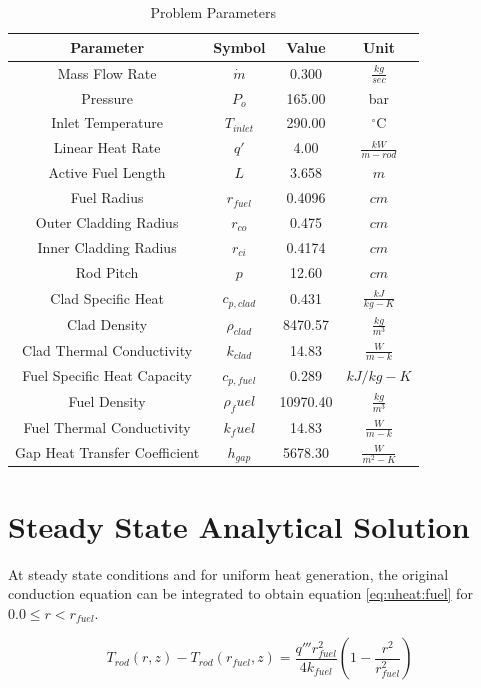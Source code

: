 \begin{table}[h]
\center
\caption{Problem Parameters}
\label{table:heating:parameters}
\begin{tabular}{|c|c|c|c|}
\hline
Parameter			&	Symbol	&	Value	&	Unit	\\ \hline
Mass Flow Rate 		& $\dot{m}$ &   0.300   &   $\frac{kg}{sec}$  \\ \hline
Pressure			&	$P_{o}$	&	165.00	&	bar	\\ \hline
Inlet Temperature	&$T_{inlet}$&	290.00	&	$^{\circ}$C	\\ \hline
Linear Heat  Rate	& $q'$  	& 	4.00 	& $\frac{kW}{m-rod}$ \\ \hline
Active Fuel Length 	& $L$		& 	3.658	& $m$	\\ \hline
Fuel Radius	& $r_{fuel}$ & 0.4096 & $cm$ \\ \hline
Outer Cladding Radius &	$r_{co}$ & 	0.475	& $cm$ \\ \hline
Inner Cladding Radius & $r_{ci}$ &	0.4174	& $cm$ \\ \hline
Rod Pitch	& $p$ &	12.60	& $cm$ \\ \hline
Clad Specific Heat	& $c_{p,clad}$	& 0.431&  $\frac{kJ}{kg-K}$ \\ \hline
Clad Density & $\rho_{clad}$ &	8470.57 & $\frac{kg}{m^{3}}$ \\ \hline
Clad Thermal Conductivity & $k_{clad}$ & 14.83 & $\frac{W}{m-k}$ \\ \hline
Fuel Specific Heat Capacity & $c_{p,fuel}$ & 0.289 & $kJ/kg-K$ \\ \hline
Fuel Density & $\rho_fuel$ & 10970.40 & $\frac{kg}{m^{3}}$ \\ \hline
Fuel Thermal Conductivity & $k_fuel$ & 14.83 & $\frac{W}{m-k}$ \\ \hline
Gap Heat Transfer Coefficient & $h_{gap}$ & 5678.30	& $\frac{W}{m^2-K}$ \\
\hline
\end{tabular}
\end{table}

\section{Steady State Analytical Solution}

At steady state conditions and for uniform heat generation, the original
conduction equation can be integrated to obtain equation \ref{eq:uheat:fuel} for
$0.0 \leq r < r_{fuel}$.

\begin{equation}
	\label{eq:uheat:fuel}
	T_{rod}(r,z)-T_{rod}(r_{fuel},z)
	=\frac{q''' r_{fuel}^{2}}{4 k_{fuel}}\left(1-\frac{r^{2}}{r_{fuel}^{2}}\right)
\end{equation}

